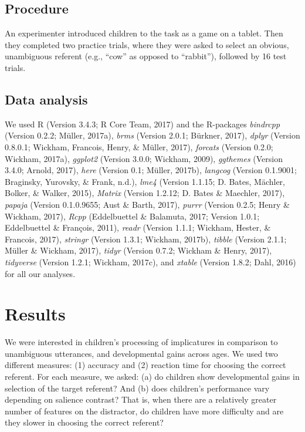 \documentclass[man]{apa6}
\begin{document}
\subsection{Procedure}\label{procedure}

An experimenter introduced children to the task as a game on a tablet.
Then they completed two practice trials, where they were asked to select
an obvious, unambiguous referent (e.g., \enquote{cow} as opposed to
\enquote{rabbit}), followed by 16 test trials.

\subsection{Data analysis}\label{data-analysis}

We used R (Version 3.4.3; R Core Team, 2017) and the R-packages
\emph{bindrcpp} (Version 0.2.2; Müller, 2017a), \emph{brms} (Version
2.0.1; Bürkner, 2017), \emph{dplyr} (Version 0.8.0.1; Wickham, Francois,
Henry, \& Müller, 2017), \emph{forcats} (Version 0.2.0; Wickham, 2017a),
\emph{ggplot2} (Version 3.0.0; Wickham, 2009), \emph{ggthemes} (Version
3.4.0; Arnold, 2017), \emph{here} (Version 0.1; Müller, 2017b),
\emph{langcog} (Version 0.1.9001; Braginsky, Yurovsky, \& Frank, n.d.),
\emph{lme4} (Version 1.1.15; D. Bates, Mächler, Bolker, \& Walker,
2015), \emph{Matrix} (Version 1.2.12; D. Bates \& Maechler, 2017),
\emph{papaja} (Version 0.1.0.9655; Aust \& Barth, 2017), \emph{purrr}
(Version 0.2.5; Henry \& Wickham, 2017), \emph{Rcpp} (Eddelbuettel \&
Balamuta, 2017; Version 1.0.1; Eddelbuettel \& François, 2011),
\emph{readr} (Version 1.1.1; Wickham, Hester, \& Francois, 2017),
\emph{stringr} (Version 1.3.1; Wickham, 2017b), \emph{tibble} (Version
2.1.1; Müller \& Wickham, 2017), \emph{tidyr} (Version 0.7.2; Wickham \&
Henry, 2017), \emph{tidyverse} (Version 1.2.1; Wickham, 2017c), and
\emph{xtable} (Version 1.8.2; Dahl, 2016) for all our analyses.

\section{Results}\label{results}

We were interested in children's processing of implicatures in
comparison to unambiguous utterances, and developmental gains across
ages. We used two different measures: (1) accuracy and (2) reaction time
for choosing the correct referent. For each measure, we asked: (a) do
children show developmental gains in selection of the target referent?
And (b) does children's performance vary depending on salience contrast?
That is, when there are a relatively greater number of features on the
distractor, do children have more difficulty and are they slower in
choosing the correct referent?
\end{document}
